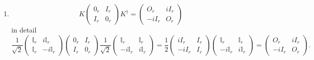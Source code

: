\documentclass[aps,preprint]{revtex4}
\begin{document}
\begin{enumerate}
\begin{enumerate}
\item 
\begin{equation}
K\left( 
\begin{array}{cc}
0_{r} & I_{r} \\ 
I_{r} & 0_{r}%
\end{array}%
\right) K^{\dagger }=\left( 
\begin{array}{cc}
O_{r} & iI_{r} \\ 
-iI_{r} & O_{r}%
\end{array}%
\right)
\end{equation}%
in detail%
\begin{equation}
\frac{1}{\sqrt{2}}\left( 
\begin{array}{cc}
\mathbb{I}_{r} & i\mathbb{I}_{r} \\ 
\mathbb{I}_{r} & -i\mathbb{I}_{r}%
\end{array}%
\right) \left( 
\begin{array}{cc}
0_{r} & I_{r} \\ 
I_{r} & 0_{r}%
\end{array}%
\right) \frac{1}{\sqrt{2}}\left( 
\begin{array}{cc}
\mathbb{I}_{r} & \mathbb{I}_{r} \\ 
-i\mathbb{I}_{r} & i\mathbb{I}_{r}%
\end{array}%
\right) =\frac{1}{2}\left( 
\begin{array}{cc}
iI_{r} & I_{r} \\ 
-iI_{r} & I_{r}%
\end{array}%
\right) \left( 
\begin{array}{cc}
\mathbb{I}_{r} & \mathbb{I}_{r} \\ 
-i\mathbb{I}_{r} & i\mathbb{I}_{r}%
\end{array}%
\right) =\left( 
\begin{array}{cc}
O_{r} & iI_{r} \\ 
-iI_{r} & O_{r}%
\end{array}%
\right) .
\end{equation}


\end{enumerate}
\end{enumerate}
\end{document}
